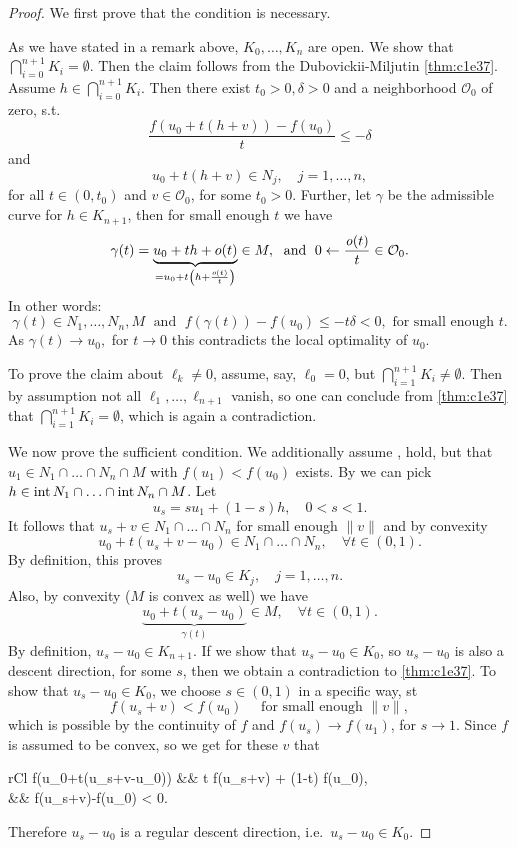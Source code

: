 \documentclass[../skript.tex]{subfiles}
\begin{document}
\begin{proof}
	We first prove that the condition is necessary.\par
	As we have stated in a remark above, $K_0,\ldots,K_n$ are open. We show that $\bigcap_{i=0}^{n+1}K_i=\emptyset$. Then the claim follows from the Dubovickii-Miljutin \cref{thm:c1e37}. Assume $h\in\bigcap_{i=0}^{n+1}K_i$. Then there exist $t_0>0,\delta>0$ and a neighborhood $\mathcal{O}_0$ of zero, s.t.
	\[
		\frac{f(u_0+  t(h+v)) - f(u_0)}{t}\leq -\delta 
	\]
	and
	\[
		u_0 + t(h+v)\in N_j,\quad j=1,\ldots,n,
	\]
	for all $t\in(0,t_0)$ and $v\in\mathcal{O}_0$, for some $t_0 > 0$. Further, let $\gamma$ be the admissible curve for $h\in K_{n+1}$, then for small enough $t$ we have
	\[
		\gamma(t) = \underbrace{u_0 + th + o(t)}_{=u_0 + t\left(h+\frac{\mathit{o}(t)}{t}\right)}\in M, \; \text{ and } \; 0\leftarrow\frac{\mathit{o}(t)}{t}\in\mathcal{O}_0.
	\]
	In other words:
	\[
		\gamma(t)\in N_1,\ldots,N_n,M\;\text{ and }\;f(\gamma(t)) - f(u_0) \leq -t\delta < 0,\text{ for small enough }t.
	\]
	As $\gamma(t)\to u_0,$ for $t\to 0$ this contradicts the local optimality of $u_0$.\par
	To prove the claim about $\ell_k\not=0$, assume, say, $\ell_0 = 0$, but $\bigcap_{i=1}^{n+1}K_i\not=\emptyset$. Then by assumption not all $\ell_1,\ldots,\ell_{n+1}$ vanish, so one can conclude from \cref{thm:c1e37} that $\bigcap_{i=1}^{n+1}K_i = \emptyset$, which is again a contradiction.\par
	We now prove the sufficient condition. We additionally assume ,  hold, but that $u_1\in N_1\cap\ldots\cap N_n\cap M$ with $f(u_1)<f(u_0)$ exists. By  we can pick $h\in \operatorname{int} N_1 \cap\ldots\cap \operatorname{int} N_n\cap M$. Let
	\[
		u_s = su_1 + (1-s)h,\quad 0<s<1.
	\]
	It follows that $u_s+v\in N_1\cap\ldots\cap N_n$ for small enough $\|v\|$ and by convexity
	\[
		u_0 + t(u_s+v-u_0)\in N_1\cap\ldots\cap N_n,\quad\forall t\in (0,1).
	\]
	By definition, this proves
	\[
		u_s-u_0\in K_j,\quad j=1,\ldots,n.
	\]
	Also, by convexity ($M$ is convex as well) we have 
	\[
		\underbrace{u_0 + t(u_s-u_0)}_{\gamma(t)}\in M,\quad\forall t\in(0,1).
	\]
	By definition, $u_s-u_0 \in K_{n+1}$. If we show that $u_s-u_0\in K_0$, so $u_s-u_0$ is also a descent direction, for some $s$, then we obtain a contradiction to \cref{thm:c1e37}. To show that $u_s-u_0\in K_0$, we choose $s\in(0,1)$ in a specific way, \ac{st}
	\[
		f(u_s+v) < f(u_0)\quad\text{ for small enough }\|v\|,
	\]
	which is possible by the continuity of $f$ and $f(u_s)\to f(u_1)$, for $s\to 1$. Since $f$ is assumed to be convex, so we get for these $v$ that
	\begin{IEEEeqnarray*}{rCl}
		f(u_0+t(u_s+v-u_0)) &\leq& t f(u_s+v) + (1-t) f(u_0), \\
			&\leq& f(u_s+v)-f(u_0) < 0.
	\end{IEEEeqnarray*}
	Therefore $u_s-u_0$ is a regular descent direction, i.e.\ $u_s-u_0\in K_0$.
\end{proof}
\end{document}
